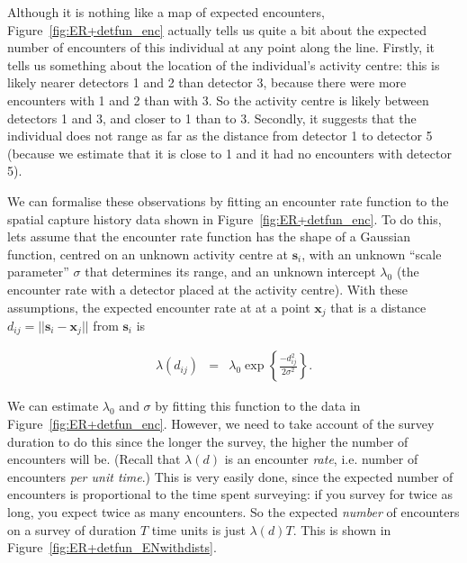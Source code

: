 \documentclass[graybox,envcountchap,sectrefs]{SpringerStyleFiles/styles/svmono}\usepackage[]{graphicx}\usepackage[]{color}
\newcommand{\be}{\begin{eqnarray}}
\newcommand{\ee}{\end{eqnarray}}
\begin{document}
Although it is nothing like a map of expected encounters, Figure~\ref{fig:ER+detfun_enc} actually tells us quite a bit about the expected number of encounters of this individual at any point along the line. Firstly, it tells us something about the location of the individual's activity centre: this is likely nearer detectors 1 and 2 than detector 3, because there were more encounters with 1 and 2 than with 3. So the activity centre is likely between detectors 1 and 3, and closer to 1 than to 3. Secondly, it suggests that the individual does not range as far as the distance from detector 1 to detector 5 (because we estimate that it is close to 1 and it had no encounters with detector 5). 

We can formalise these observations by fitting an encounter rate function to the spatial capture history data shown in Figure~\ref{fig:ER+detfun_enc}. To do this, lets assume that the encounter rate function has the shape of a Gaussian function, centred on an unknown activity centre at $\bm{s}_i$, with an unknown ``scale parameter'' $\sigma$ that determines its range, and an unknown intercept $\lambda_0$ (the encounter rate with a detector placed at the activity centre). With these assumptions, the expected encounter rate at at a point $\bm{x}_j$ that is a distance $d_{ij}=||\bm{s}_i-\bm{x}_j||$ from $\bm{s}_i$ is

\be
\lambda(d_{ij})&=&\lambda_0\exp\left\{\frac{-d_{ij}^2}{2\sigma^2}\right\}.
\label{eq:ER+detfun.lambda.hn}
\ee

We can estimate $\lambda_0$ and $\sigma$ by fitting this function to the data in Figure~\ref{fig:ER+detfun_enc}. However, we need to take account of the survey duration to do this since the longer the survey, the higher the number of encounters will be. (Recall that $\lambda(d)$ is an encounter \textit{rate}, i.e. number of encounters \textit{per unit time}.) This is very easily done, since the expected number of encounters is proportional to the time spent surveying: if you survey for twice as long, you expect twice as many encounters. So the expected \textit{number} of encounters on a survey of duration $T$ time units is just $\lambda(d)T$. This is shown in Figure~\ref{fig:ER+detfun_ENwithdists}.
\end{document}
